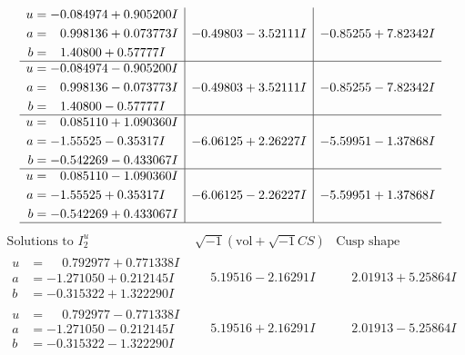 \documentclass[1p]{elsarticle_modified}
\theoremstyle{definition}
\newcommand{\I}{\sqrt{-1}}
\begin{document}
$$\begin{array}{c|c|c}
\begin{aligned}
u &= -0.084974 + 0.905200 I \\
a &= \phantom{-}0.998136 + 0.073773 I \\
b &= \phantom{-}1.40800 + 0.57777 I\end{aligned}
 & -0.49803 - 3.52111 I & -0.85255 + 7.82342 I \\ \hline\begin{aligned}
u &= -0.084974 - 0.905200 I \\
a &= \phantom{-}0.998136 - 0.073773 I \\
b &= \phantom{-}1.40800 - 0.57777 I\end{aligned}
 & -0.49803 + 3.52111 I & -0.85255 - 7.82342 I \\ \hline\begin{aligned}
u &= \phantom{-}0.085110 + 1.090360 I \\
a &= -1.55525 - 0.35317 I \\
b &= -0.542269 - 0.433067 I\end{aligned}
 & -6.06125 + 2.26227 I & -5.59951 - 1.37868 I \\ \hline\begin{aligned}
u &= \phantom{-}0.085110 - 1.090360 I \\
a &= -1.55525 + 0.35317 I \\
b &= -0.542269 + 0.433067 I\end{aligned}
 & -6.06125 - 2.26227 I & -5.59951 + 1.37868 I\\
 \hline 
 \end{array}$$\newpage$$\begin{array}{c|c|c}  
\text{Solutions to }I^u_{2}& \I (\text{vol} + \sqrt{-1}CS) & \text{Cusp shape}\\
 \hline 
\begin{aligned}
u &= \phantom{-}0.792977 + 0.771338 I \\
a &= -1.271050 + 0.212145 I \\
b &= -0.315322 + 1.322290 I\end{aligned}
 & \phantom{-}5.19516 - 2.16291 I & \phantom{-}2.01913 + 5.25864 I \\ \hline\begin{aligned}
u &= \phantom{-}0.792977 - 0.771338 I \\
a &= -1.271050 - 0.212145 I \\
b &= -0.315322 - 1.322290 I\end{aligned}
 & \phantom{-}5.19516 + 2.16291 I & \phantom{-}2.01913 - 5.25864 I \\ \hline\begin{aligned}

\end{aligned}
\end{array}$$
\end{document}
